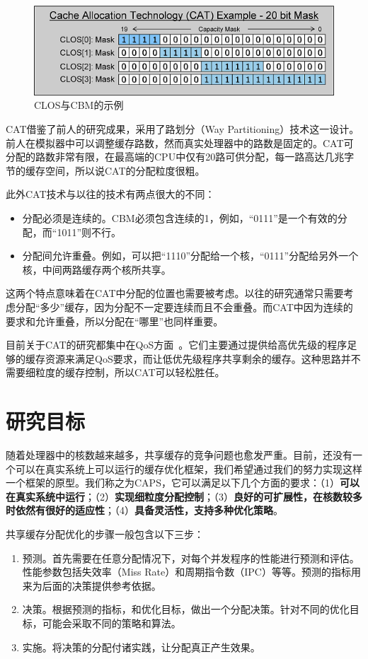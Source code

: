 \begin{figure}[htbp] 
    \centering
    \includegraphics[width=0.8\linewidth]{figures/CLOS.png}
    \caption{CLOS与CBM的示例}
    \label{fig:CLOS}
\end{figure}

CAT借鉴了前人的研究成果，采用了路划分（Way Partitioning）技术这一设计。前人在模拟器中可以调整缓存路数，然而真实处理器中的路数是固定的。CAT可分配的路数非常有限，在最高端的CPU中仅有20路可供分配，每一路高达几兆字节的缓存空间，所以说CAT的分配粒度很粗。

此外CAT技术与以往的技术有两点很大的不同：
\begin{itemize}
\item 分配必须是连续的。CBM必须包含连续的1，例如，“0111”是一个有效的分配，而“1011”则不行。
\item 分配间允许重叠。例如，可以把“1110”分配给一个核，“0111”分配给另外一个核，中间两路缓存两个核所共享。
\end{itemize}

这两个特点意味着在CAT中分配的位置也需要被考虑。以往的研究通常只需要考虑分配“多少”缓存，因为分配不一定要连续而且不会重叠。而CAT中因为连续的要求和允许重叠，所以分配在“哪里”也同样重要。

目前关于CAT的研究都集中在QoS方面~\parencite{lo2015heracles, herdrich2016cache, funaro2016ginseng}。它们主要通过提供给高优先级的程序足够的缓存资源来满足QoS要求，而让低优先级程序共享剩余的缓存。这种思路并不需要细粒度的缓存控制，所以CAT可以轻松胜任。

\section{研究目标}
随着处理器中的核数越来越多，共享缓存的竞争问题也愈发严重。目前，还没有一个可以在真实系统上可以运行的缓存优化框架，我们希望通过我们的努力实现这样一个框架的原型。我们称之为CAPS，它可以满足以下几个方面的要求：（1）\textbf{可以在真实系统中运行}；（2）\textbf{实现细粒度分配控制}；（3）\textbf{良好的可扩展性，在核数较多时依然有很好的适应性}；（4）\textbf{具备灵活性，支持多种优化策略}。

共享缓存分配优化的步骤一般包含以下三步：
\begin{enumerate}
\item 预测。首先需要在任意分配情况下，对每个并发程序的性能进行预测和评估。性能参数包括失效率（Miss Rate）和周期指令数（IPC）等等。预测的指标用来为后面的决策提供参考依据。
\item 决策。根据预测的指标，和优化目标，做出一个分配决策。针对不同的优化目标，可能会采取不同的策略和算法。
\item 实施。将决策的分配付诸实践，让分配真正产生效果。
\end{enumerate}

